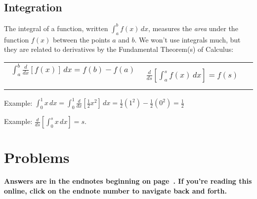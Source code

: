 \begin{CALCULUS}
\subsection*{Integration}

The integral of a function, written $\int_a^b f(x)\, dx$, measures the \emph{area} under the function $f(x)$ between the points $a$ and $b$. We won't use integrals much, but they are related to derivatives by the Fundamental Theorem(s) of Calculus:

\begin{center}
\begin{tabular}{cc}
$\displaystyle \int_a^b \frac{d}{dx}\left[ f(x)\right]\, dx  =
f(b) - f(a)$\ \ \ \ \ \  & $\displaystyle \frac{d}{ds}\left[
\int_a^s f(x)\, dx \right] = f(s)\ \ \ \ \ \ $
\end{tabular}
\end{center}

\noindent Example: $\displaystyle \int_0^1 x \, dx= \int_0^1
\frac{d}{dx}\left[ \frac{1}{2}x^2\right]\, dx  = \frac{1}{2}(1^2)
- \frac{1}{2}(0^2) = \frac{1}{2}$

\medskip

\noindent Example: $\displaystyle \frac{d}{ds}\left[ \int_0^s x\,
dx \right] = s.$

\end{CALCULUS}



\section*{Problems}

\noindent \textbf{Answers are in the endnotes beginning on page~\pageref{1introa}. If you're reading this online, click on the endnote number to navigate back and forth.}


